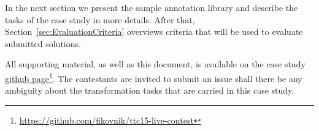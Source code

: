 In the next section we present the sample annotation library and describe the tasks of the case study in more details.
After that, Section~\ref{sec:EvaluationCriteria} overviews criteria that will be used to evaluate submitted solutions.

All supporting material, as well as this document, is available on the case study \href{https://github.com/fikovnik/ttc15-live-contest}{github page}\footnote{\url{https://github.com/fikovnik/ttc15-live-contest}}.
The contestants are invited to submit an issue shall there be any ambiguity about the transformation tasks that are carried in this case study.